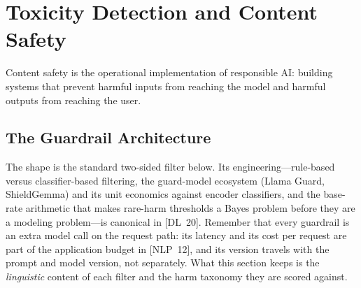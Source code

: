 \section{Toxicity Detection and Content Safety}
\label{sec:toxicity}

Content safety is the operational implementation of responsible AI: building
systems that prevent harmful inputs from reaching the model and harmful outputs
from reaching the user.

\subsection{The Guardrail Architecture}

The shape is the standard two-sided filter below.  Its engineering---rule-based
versus classifier-based filtering, the guard-model ecosystem (Llama Guard,
ShieldGemma) and its unit economics against encoder classifiers, and the
base-rate arithmetic that makes rare-harm thresholds a Bayes problem before
they are a modeling problem---is canonical in [DL~20].  Remember that every
guardrail is an extra model call on the request path: its latency and its cost
per request are part of the application budget in [NLP~12], and its version
travels with the prompt and model version, not separately.  What this section keeps is the \emph{linguistic} content of each
filter and the harm taxonomy they are scored against.

